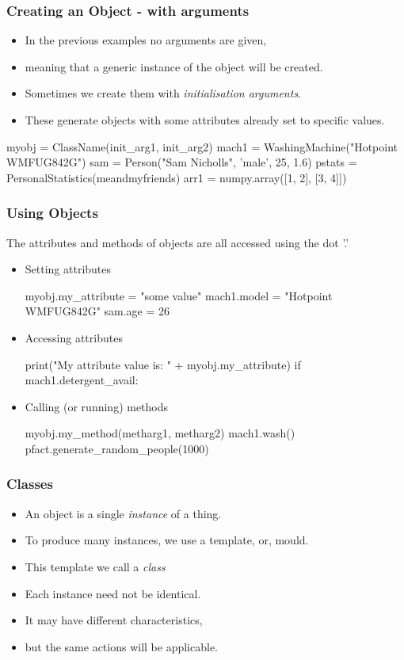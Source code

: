 \documentclass{beamer}
\begin{document}
\begin{frame}[fragile]
\frametitle{Creating an Object - with arguments}

\begin{itemize}
\item In the previous examples no arguments are given,
\item meaning that a generic instance of the object will be created.
\item Sometimes we create them with \emph{initialisation arguments}.
\item These generate objects with some attributes already set to specific values.
\end{itemize}

\begin{code}
myobj = ClassName(init_arg1, init_arg2)
mach1 = WashingMachine("Hotpoint WMFUG842G")
sam = Person("Sam Nicholls", 'male', 25, 1.6)
pstats = PersonalStatistics(meandmyfriends)
arr1 = numpy.array([1, 2], [3, 4]])
\end{code}
\end{frame}

\begin{frame}[fragile]
\frametitle{Using Objects}
The attributes and methods of objects are all accessed using the dot '.'
\begin{itemize}
\item Setting attributes
\begin{code}
myobj.my_attribute = "some value"
mach1.model = "Hotpoint WMFUG842G"
sam.age = 26
\end{code}
\item Accessing attributes
\begin{code}
print("My attribute value is: " + myobj.my_attribute)
if mach1.detergent_avail:
\end{code}
\item Calling (or running) methods
\begin{code}
myobj.my_method(metharg1, metharg2)
mach1.wash()
pfact.generate_random_people(1000)
\end{code}
\end{itemize}
\end{frame}

\begin{frame}[fragile]
\frametitle{Classes}
\begin{itemize}
\item An object is a single \emph{instance} of a thing.
\item To produce many instances, we use a template, or, mould.
\item This template we call a \emph{class}
\item Each instance need not be identical.
\item It may have different characteristics,
\item but the same actions will be applicable.
\end{itemize}
\end{frame}
\end{document}
